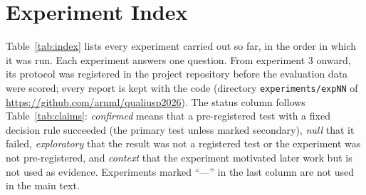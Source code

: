 \chapter{Experiment Index}
\label{app:index}

Table~\ref{tab:index} lists every experiment carried out so far, in the order in which it was run. Each experiment answers one question. From experiment 3 onward, its protocol was registered in the project repository before the evaluation data were scored; every report is kept with the code (directory \texttt{experiments/expNN} of \url{https://github.com/arnml/qualiusp2026}). The status column follows Table~\ref{tab:claims}: \emph{confirmed} means that a pre-registered test with a fixed decision rule succeeded (the primary test unless marked secondary), \emph{null} that it failed, \emph{exploratory} that the result was not a registered test or the experiment was not pre-registered, and \emph{context} that the experiment motivated later work but is not used as evidence. Experiments marked ``---'' in the last column are not used in the main text.

